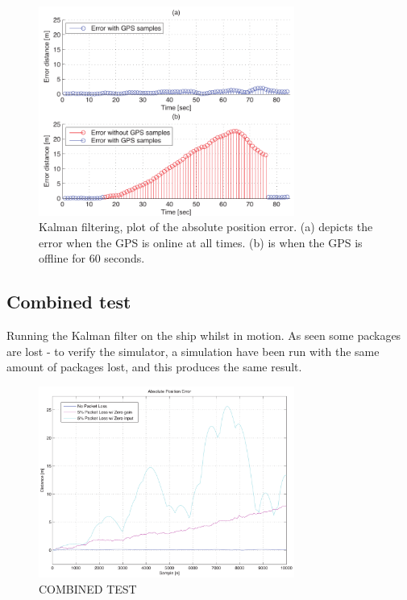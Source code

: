 \documentclass{ifacconf}
\begin{document}
\begin{figure}
	\begin{center}
		\includegraphics[width=8.4cm]{img/error}    %
		\caption{Kalman filtering, plot of the absolute position error. (a) depicts the error when the GPS is online at all times. (b) is when the GPS is offline for 60 seconds.}  %
		\label{fig:error}               
	\end{center}                                 %
\end{figure}

\subsection{Combined test}
Running the Kalman filter on the ship whilst in motion. As seen some packages are lost - to verify the simulator, a simulation have been run with the same amount of packages lost, and this produces the same result. 
\begin{figure}
	\begin{center}
		\includegraphics[width=8.4cm]{img/abspos}    %
		\caption{COMBINED TEST}  %
		\label{fig:3points}               
	\end{center}                                 %
\end{figure}
\end{document}
